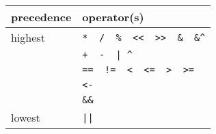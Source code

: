 \begin{tabular}{ll}
\textbf{precedence} & \textbf{operator(s)} \\ \hline
highest   &	\verb!*  /  %  <<  >>  &  &^!		\\
    &	\verb!+  -  | ^!			\\
    &	\verb+==  !=  <  <=  >  >=+		\\
    &	\verb!<-!				\\
    &	\verb!&&!				\\
lowest    &	\verb!||!				\\
\end{tabular}
